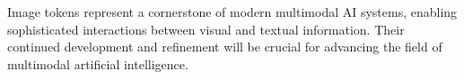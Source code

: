 \begin{comment}
\begin{enumerate}
\item \textbf{Appropriate Token Count}: For tasks like VQA or captioning, start with a multi-token approach (e.g., 8-32 tokens) as it generally provides a richer signal. For simple image-text retrieval, a single global image token might be sufficient and more efficient
\item \textbf{Feature Alignment}: Use a dedicated linear projection layer to map your visual features into the text embedding dimension. Do not simply truncate or pad the visual features, as this will destroy learned information. Initialize this layer carefully
\item \textbf{Position Encoding}: Include appropriate positional information for image tokens in sequences
\item \textbf{Attention Regularization}: Monitor and guide attention patterns between modalities
\item \textbf{Multi-Scale Training}: Train on images of varying resolutions and aspect ratios
\item \textbf{Contrastive Objectives}: Contrastive pre-training (like CLIP) is the de-facto standard for building powerful, aligned vision-language models. It is highly recommended as a pre-training step before fine-tuning on specific downstream tasks
\item \textbf{Data Augmentation}: Apply both visual and textual augmentation strategies
\item \textbf{Evaluation Diversity}: Test on diverse cross-modal tasks to ensure robust performance
\end{enumerate}
\begin{comment}
Feedback: This is a good list. To make it more actionable:
1.  **Appropriate Token Count**: "For tasks like VQA or captioning, start with a multi-token approach (e.g., 8-32 tokens) as it generally provides a richer signal. For simple image-text retrieval, a single global image token might be sufficient and more efficient."
2.  **Feature Alignment**: "Use a dedicated linear projection layer to map your visual features into the text embedding dimension. Do not simply truncate or pad the visual features, as this will destroy learned information. Initialize this layer carefully."
3.  **Contrastive Objectives**: "Contrastive pre-training (like CLIP) is the de-facto standard for building powerful, aligned vision-language models. It is highly recommended as a pre-training step before fine-tuning on specific downstream tasks."

STATUS: addressed - enhanced the three key recommendations with specific, actionable guidance
\end{comment}

Image tokens represent a cornerstone of modern multimodal AI systems, enabling sophisticated interactions between visual and textual information. Their continued development and refinement will be crucial for advancing the field of multimodal artificial intelligence.
